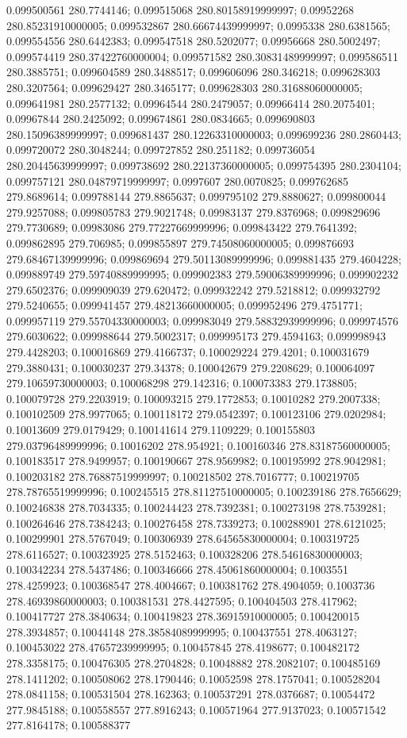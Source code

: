 0.099500561 280.7744146; 0.099515068 280.80158919999997; 0.09952268 280.85231910000005; 0.099532867 280.66674439999997; 0.0995338 280.6381565; 0.099554556 280.6442383; 0.099547518 280.5202077; 0.09956668 280.5002497; 0.099574419 280.37422760000004; 0.099571582 280.30831489999997; 0.099586511 280.3885751; 0.099604589 280.3488517; 0.099606096 280.346218; 0.099628303 280.3207564; 0.099629427 280.3465177; 0.099628303 280.31688060000005; 0.099641981 280.2577132; 0.09964544 280.2479057; 0.09966414 280.2075401; 0.09967844 280.2425092; 0.099674861 280.0834665; 0.099690803 280.15096389999997; 0.099681437 280.12263310000003; 0.099699236 280.2860443; 0.099720072 280.3048244; 0.099727852 280.251182; 0.099736054 280.20445639999997; 0.099738692 280.22137360000005; 0.099754395 280.2304104; 0.099757121 280.04879719999997; 0.0997607 280.0070825; 0.099762685 279.8689614; 0.099788144 279.8865637; 0.099795102 279.8880627; 0.099800044 279.9257088; 0.099805783 279.9021748; 0.09983137 279.8376968; 0.099829696 279.7730689; 0.09983086 279.77227669999996; 0.099843422 279.7641392; 0.099862895 279.706985; 0.099855897 279.74508060000005; 0.099876693 279.68467139999996; 0.099869694 279.50113089999996; 0.099881435 279.4604228; 0.099889749 279.59740889999995; 0.099902383 279.59006389999996; 0.099902232 279.6502376; 0.099909039 279.620472; 0.099932242 279.5218812; 0.099932792 279.5240655; 0.099941457 279.48213660000005; 0.099952496 279.4751771; 0.099957119 279.55704330000003; 0.099983049 279.58832939999996; 0.099974576 279.6030622; 0.099988644 279.5002317; 0.099995173 279.4594163; 0.099998943 279.4428203; 0.100016869 279.4166737; 0.100029224 279.4201; 0.100031679 279.3880431; 0.100030237 279.34378; 0.100042679 279.2208629; 0.100064097 279.10659730000003; 0.100068298 279.142316; 0.100073383 279.1738805; 0.100079728 279.2203919; 0.100093215 279.1772853; 0.10010282 279.2007338; 0.100102509 278.9977065; 0.100118172 279.0542397; 0.100123106 279.0202984; 0.10013609 279.0179429; 0.100141614 279.1109229; 0.100155803 279.03796489999996; 0.10016202 278.954921; 0.100160346 278.83187560000005; 0.100183517 278.9499957; 0.100190667 278.9569982; 0.100195992 278.9042981; 0.100203182 278.76887519999997; 0.100218502 278.7016777; 0.100219705 278.78765519999996; 0.100245515 278.81127510000005; 0.100239186 278.7656629; 0.100246838 278.7034335; 0.100244423 278.7392381; 0.100273198 278.7539281; 0.100264646 278.7384243; 0.100276458 278.7339273; 0.100288901 278.6121025; 0.100299901 278.5767049; 0.100306939 278.64565830000004; 0.100319725 278.6116527; 0.100323925 278.5152463; 0.100328206 278.54616830000003; 0.100342234 278.5437486; 0.100346666 278.45061860000004; 0.1003551 278.4259923; 0.100368547 278.4004667; 0.100381762 278.4904059; 0.1003736 278.46939860000003; 0.100381531 278.4427595; 0.100404503 278.417962; 0.100417727 278.3840634; 0.100419823 278.36915910000005; 0.100420015 278.3934857; 0.10044148 278.38584089999995; 0.100437551 278.4063127; 0.100453022 278.47657239999995; 0.100457845 278.4198677; 0.100482172 278.3358175; 0.100476305 278.2704828; 0.10048882 278.2082107; 0.100485169 278.1411202; 0.100508062 278.1790446; 0.10052598 278.1757041; 0.100528204 278.0841158; 0.100531504 278.162363; 0.100537291 278.0376687; 0.10054472 277.9845188; 0.100558557 277.8916243; 0.100571964 277.9137023; 0.100571542 277.8164178; 0.100588377 
